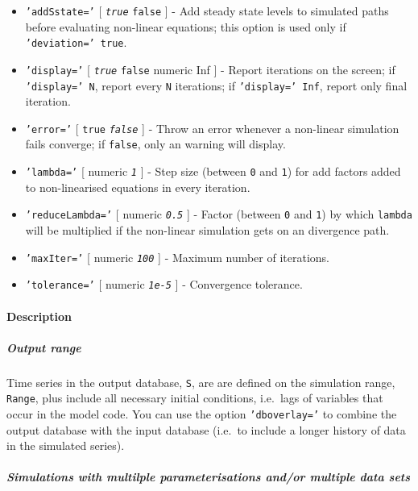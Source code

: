  \begin{itemize}
 \item
   \texttt{'addSstate='} {[} \emph{\texttt{true}} \textbar{}
   \texttt{false} {]} - Add steady state levels to simulated paths before
   evaluating non-linear equations; this option is used only if
   \texttt{'deviation=' true}.
 \item
   \texttt{'display='} {[} \emph{\texttt{true}} \textbar{} \texttt{false}
   \textbar{} numeric \textbar{} Inf {]} - Report iterations on the
   screen; if \texttt{'display=' N}, report every \texttt{N} iterations;
   if \texttt{'display=' Inf}, report only final iteration.
 \item
   \texttt{'error='} {[} \texttt{true} \textbar{} \emph{\texttt{false}}
   {]} - Throw an error whenever a non-linear simulation fails converge;
   if \texttt{false}, only an warning will display.
 \item
   \texttt{'lambda='} {[} numeric \textbar{} \emph{\texttt{1}} {]} - Step
   size (between \texttt{0} and \texttt{1}) for add factors added to
   non-linearised equations in every iteration.
 \item
   \texttt{'reduceLambda='} {[} numeric \textbar{} \emph{\texttt{0.5}}
   {]} - Factor (between \texttt{0} and \texttt{1}) by which
   \texttt{lambda} will be multiplied if the non-linear simulation gets
   on an divergence path.
 \item
   \texttt{'maxIter='} {[} numeric \textbar{} \emph{\texttt{100}} {]} -
   Maximum number of iterations.
 \item
   \texttt{'tolerance='} {[} numeric \textbar{} \emph{\texttt{1e-5}} {]}
   - Convergence tolerance.
 \end{itemize}
 
 \paragraph{Description}
 
 \subparagraph{Output range}
 
 Time series in the output database, \texttt{S}, are are defined on the
 simulation range, \texttt{Range}, plus include all necessary initial
 conditions, i.e.~lags of variables that occur in the model code. You can
 use the option \texttt{'dboverlay='} to combine the output database with
 the input database (i.e.~to include a longer history of data in the
 simulated series).
 
 \subparagraph{Simulations with multilple parameterisations and/or
 multiple data sets}
 
